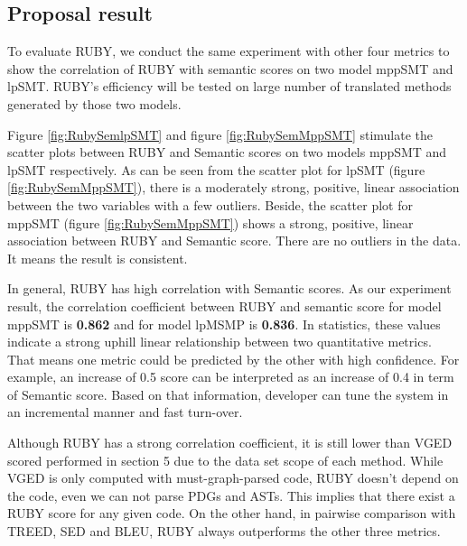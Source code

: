 \subsection{Proposal result}
To evaluate RUBY, we conduct the same experiment with other four metrics to show the correlation of RUBY with semantic scores on two model mppSMT and lpSMT. RUBY's efficiency will be tested on large number of translated methods generated by those two models. 

Figure \ref{fig:RubySemlpSMT} and figure \ref{fig:RubySemMppSMT} stimulate the scatter plots between RUBY and Semantic scores on two models mppSMT and lpSMT respectively. As can be seen from the scatter plot for lpSMT (figure \ref{fig:RubySemMppSMT}), there is a moderately strong, positive, linear association between the two variables with a few outliers.  
Beside, the scatter plot for mppSMT (figure \ref{fig:RubySemMppSMT}) shows a strong, positive, linear association between RUBY and Semantic score. There are no outliers in the data. It means the result is consistent. 

In general, RUBY has high correlation with Semantic scores. As our experiment result, the correlation coefficient between RUBY and semantic score for model mppSMT is \textbf{0.862} and for model lpMSMP is \textbf{0.836}. In statistics, these values indicate a strong uphill linear relationship between two quantitative metrics. That means one metric could be predicted by the other with high confidence. For example, an increase of 0.5 {\model} score can be interpreted as an increase of 0.4 in term of Semantic score. Based on that information, developer can tune the system in an incremental manner and fast turn-over. 



Although RUBY has a strong correlation coefficient, it is still lower than VGED scored performed in section 5 due to the data set scope of each method. While VGED is only computed with must-graph-parsed code, RUBY doesn't depend on the code, even we can not parse PDGs and ASTs. This implies that there exist a RUBY score for any given code. On the other hand, in pairwise comparison with TREED, SED and BLEU, RUBY always outperforms the other three metrics.
	    
  			